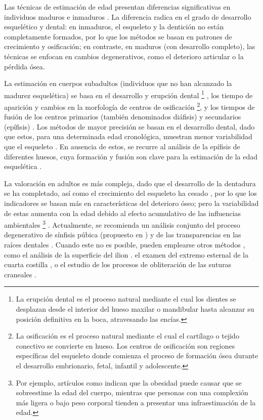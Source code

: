 Las técnicas de estimación de edad presentan diferencias significativas en individuos maduros e inmaduros \cite{ubelaker2019}. La diferencia radica en el grado de desarrollo esquelético y dental: en inmaduros, el esqueleto y la dentición no están completamente formados, por lo que los métodos se basan en patrones de crecimiento y osificación; en contraste, en maduros (con desarrollo completo), las técnicas se enfocan en cambios degenerativos, como el deterioro articular o la pérdida ósea.

La estimación en cuerpos subadultos (individuos que no han alcanzado la madurez esquelética) se basa en el desarrollo y erupción dental%
\footnote{
    La erupción dental es el proceso natural mediante el cual los dientes se desplazan desde el interior del hueso maxilar o mandibular hasta alcanzar su posición definitiva en la boca, atravesando las encías.
} 
\cite{cameriere2006}, los tiempo de aparición y cambios en la morfología de centros de osificación%
\footnote{
    La osificación es el proceso natural mediante el cual el cartílago o tejido conectivo se convierte en hueso. Los centros de osificación son regiones específicas del esqueleto donde comienza el proceso de formación ósea durante el desarrollo embrionario, fetal, infantil y adolescente.
},
y los tiempos de fusión de los centros primarios (también denominados diáfisis) y secundarios (epífisis) \cite{scheuer2000, adserias2019}. Los métodos de mayor precisión se basan en el desarrollo dental, dado que estos, para una determinada edad cronológica, muestran menor variabilidad que el esqueleto \cite{bowman1992}. En ausencia de estos, se recurre al análisis de la epífisis de diferentes huesos, cuya formación y fusión son clave para la estimación de la edad esquelética \cite{adserias2019}.

La valoración en adultos es más compleja, dado que el desarrollo de la dentadura se ha completado, así como el crecimiento del esqueleto ha cesado \cite{byers2023}, por lo que los indicadores se basan más en características del deterioro óseo; pero la variabilidad de estas aumenta con la edad debido al efecto acumulativo de las influencias ambientales%
\footnote{
    Por ejemplo, artículos como \cite{merritt2015,wescott2015} indican que la obesidad puede causar que se sobreestime la edad del cuerpo, mientras que personas con una complexión más ligera o bajo peso corporal tienden a presentar una infraestimación de la edad.
}
\cite{ubelaker2018, scheuer2004}. Actualmente, se recomienda un análisis conjunto del proceso degenerativo de sínfisis púbica (propuesto en \cite{brooks1990}) y de las transparencias en las raíces dentales \cite{baccino2014}. Cuando este no es posible, pueden emplearse otros métodos \cite{garvin2012}, como el análisis de la superficie del ilion \cite{lovejoy1985}. el examen del extremo esternal de la cuarta costilla \cite{iscan1984}, o el estudio de los procesos de obliteración de las suturas craneales \cite{meindl1985}.

